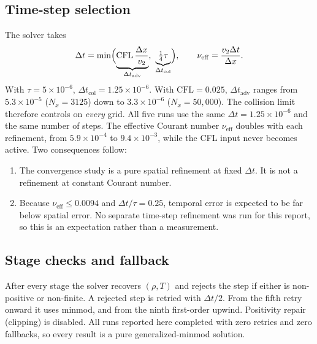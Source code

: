 \documentclass[11pt]{article}
\theoremstyle{remark}
\begin{document}
\subsection{Time-step selection}
\label{sec:dt}
The solver takes
\begin{equation}
  \Delta t = \min\Bigl(\underbrace{\mathrm{CFL}\,\frac{\Delta x}{v_2}}_{\Delta t_{\mathrm{adv}}},\ \underbrace{\tfrac14\tau}_{\Delta t_{\mathrm{col}}}\Bigr),
  \qquad \nu_{\mathrm{eff}} = \frac{v_2\Delta t}{\Delta x}.
  \label{eq:dt}
\end{equation}
With $\tau=5\times10^{-6}$, $\Delta t_{\mathrm{col}}=1.25\times10^{-6}$.  With
$\mathrm{CFL}=0.025$, $\Delta t_{\mathrm{adv}}$ ranges from $5.3\times10^{-5}$ ($N_x=3125$)
down to $3.3\times10^{-6}$ ($N_x=50{,}000$).  The collision limit therefore controls
on \emph{every} grid.  All five runs use the same $\Delta t=1.25\times10^{-6}$ and
the same number of steps.  The effective Courant number $\nu_{\mathrm{eff}}$ doubles
with each refinement, from $5.9\times10^{-4}$ to $9.4\times10^{-3}$, while the CFL
input never becomes active.  Two consequences follow:
\begin{enumerate}
  \item The convergence study is a pure spatial refinement at fixed $\Delta t$.  It
        is not a refinement at constant Courant number.
  \item Because $\nu_{\mathrm{eff}}\le 0.0094$ and $\Delta t/\tau = 0.25$, temporal error
        is expected to be far below spatial error.  No separate time-step
        refinement was run for this report, so this is an expectation rather than a
        measurement.
\end{enumerate}

\subsection{Stage checks and fallback}
After every stage the solver recovers $(\rho,T)$ and rejects the step if either is
non-positive or non-finite.  A rejected step is retried with $\Delta t/2$.  From the
fifth retry onward it uses minmod, and from the ninth first-order upwind.  Positivity
repair (clipping) is disabled.  All runs reported here completed with zero retries
and zero fallbacks, so every result is a pure generalized-minmod solution.
\end{document}
